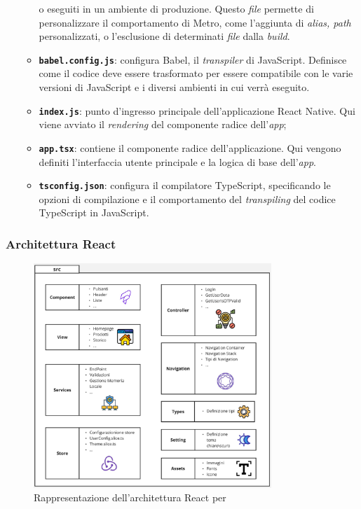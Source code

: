 \begin{itemize}
\begin{itemize}
                  o eseguiti in un ambiente di produzione. Questo \textit{file} permette di personalizzare il comportamento di Metro, come 
                  l'aggiunta di \textit{alias, path} personalizzati, o l'esclusione di determinati \textit{file} dalla \textit{build}.
            \item \textbf{\texttt{babel.config.js}}: configura Babel, il \textit{transpiler} di JavaScript. 
                  Definisce come il codice deve essere trasformato per essere compatibile con le varie versioni di JavaScript e i 
                  diversi ambienti in cui verrà eseguito.
            \item \textbf{\texttt{index.js}}: punto d'ingresso principale dell'applicazione React Native. Qui viene 
                  avviato il \textit{rendering} del componente radice dell'\textit{app};
            \item \textbf{\texttt{app.tsx}}: contiene il componente radice dell'applicazione. Qui vengono definiti l'interfaccia 
                  utente principale e la logica di base dell'\textit{app}.
            \item \textbf{\texttt{tsconfig.json}}: configura il compilatore TypeScript, specificando le opzioni di compilazione 
            e il comportamento del \textit{transpiling} del codice TypeScript in JavaScript.
          \end{itemize}
\end{itemize}
\subsubsection{Architettura React}

\begin{figure}[H]
      \centering
      \includegraphics[width=0.8\textwidth]{img/react_architecture.jpg}
      \caption{Rappresentazione dell'architettura React per {\movi}}
      \label{fig:frontend architecture}
\end{figure}

